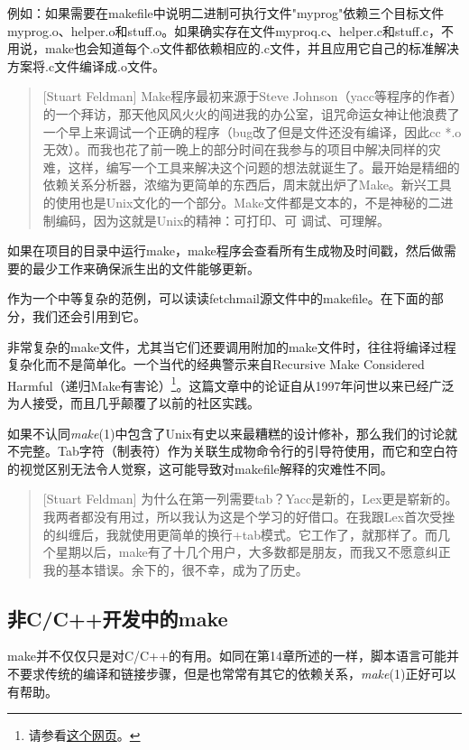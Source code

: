 \documentclass[12pt,oneside]{book}
\begin{document}
\begin{common-format}
例如：如果需要在makefile中说明二进制可执行文件"myprog"依赖三个目标文件myprog.o、helper.o和stuff.o。如果确实存在文件myproq.c、helper.c和stuff.c，不用说，make也会知道每个.o文件都依赖相应的.c文件，并且应用它自己的标准解决方案将.c文件编译成.o文件。

\begin{quote}[Stuart Feldman]
Make程序最初来源于Steve Johnson（yacc等程序的作者）的一个拜访，那天他风风火火的闯进我的办公室，诅咒命运女神让他浪费了一个早上来调试一个正确的程序（bug改了但是文件还没有编译，因此cc *.o无效）。而我也花了前一晚上的部分时间在我参与的项目中解决同样的灾难，这样，编写一个工具来解决这个问题的想法就诞生了。最开始是精细的依赖关系分析器，浓缩为更简单的东西后，周末就出炉了Make。新兴工具的使用也是Unix文化的一个部分。Make文件都是文本的，不是神秘的二进制编码，因为这就是Unix的精神：可打印、可
调试、可理解。
\end{quote}

如果在项目的目录中运行make，make程序会查看所有生成物及时间戳，然后做需要的最少工作来确保派生出的文件能够更新。

作为一个中等复杂的范例，可以读读fetchmail源文件中的makefile。在下面的部分，我们还会引用到它。

非常复杂的make文件，尤其当它们还要调用附加的make文件时，往往将编译过程复杂化而不是简单化。一个当代的经典警示来自Recursive Make Considered Harmful（递归Make有害论）\footnote{请参看\href{http://www.tip.net.au/~millerp/rmch/recu-make-cons-harm.html}{这个网页}。}。这篇文章中的论证自从1997年问世以来已经广泛为人接受，而且几乎颠覆了以前的社区实践。

如果不认同\textit{make}(1)中包含了Unix有史以来最糟糕的设计修补，那么我们的讨论就不完整。Tab字符（制表符）作为关联生成物命令行的引导符使用，而它和空白符的视觉区别无法令人觉察，这可能导致对makefile解释的灾难性不同。

\begin{quote}[Stuart Feldman]
为什么在第一列需要tab？Yacc是新的，Lex更是崭新的。我两者都没有用过，所以我认为这是个学习的好借口。在我跟Lex首次受挫的纠缠后，我就使用更简单的换行+tab模式。它工作了，就那样了。而几个星期以后，make有了十几个用户，大多数都是朋友，而我又不愿意纠正我的基本错误。余下的，很不幸，成为了历史。
\end{quote}


\subsection{非C/C++开发中的make}
make并不仅仅只是对C/C++的有用。如同在第14章所述的一样，脚本语言可能并不要求传统的编译和链接步骤，但是也常常有其它的依赖关系，\textit{make}(1)正好可以有帮助。


\end{common-format}
\end{document}
